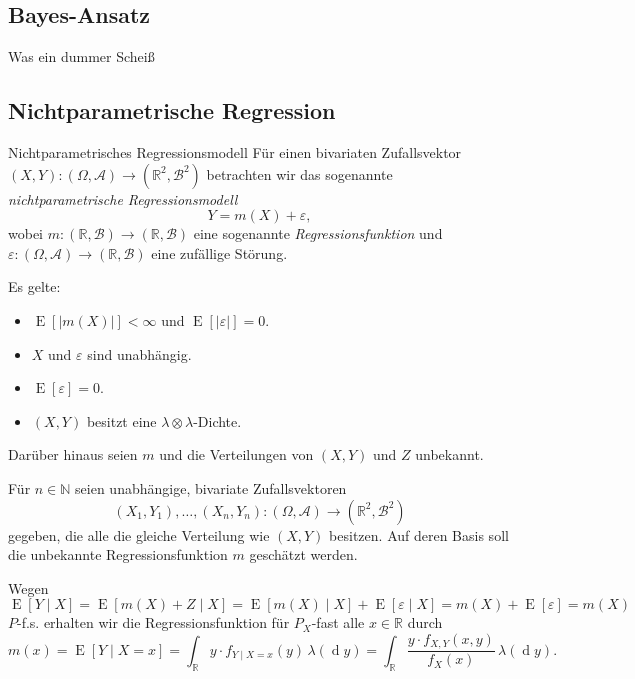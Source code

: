 \subsection{Bayes-Ansatz}

Was ein dummer Scheiß

\subsection{Nichtparametrische Regression}

\begin{defi}{Nichtparametrisches Regressionsmodell}
    Für einen bivariaten Zufallsvektor $(X, Y) : (\Omega, \mathcal{A}) \to (\mathbb{R}^2, \mathcal{B}^2)$ betrachten wir das sogenannte \emph{nichtparametrische Regressionsmodell}
    \[
        Y = m(X) + \varepsilon,
    \]
    wobei $m : (\mathbb{R}, \mathcal{B}) \to (\mathbb{R}, \mathcal{B})$ eine sogenannte \emph{Regressionsfunktion} und $\varepsilon: (\Omega, \mathcal{A}) \to (\mathbb{R}, \mathcal{B})$ eine zufällige Störung.

    Es gelte:
    \begin{itemize}
        \item $\operatorname{E}[|m(X)|] < \infty$ und $\operatorname{E}[|\varepsilon|] = 0$.
        \item $X$ und $\varepsilon$ sind unabhängig.
        \item $\operatorname{E}[\varepsilon] = 0$.
        \item $(X, Y)$ besitzt eine $\lambda \otimes \lambda$-Dichte.
    \end{itemize}

    Darüber hinaus seien $m$ und die Verteilungen von $(X, Y)$ und $Z$ unbekannt.

    Für $n \in \mathbb{N}$ seien unabhängige, bivariate Zufallsvektoren
    \[
        (X_1, Y_1), \ldots, (X_n, Y_n) : (\Omega, \mathcal{A}) \to (\mathbb{R}^2, \mathcal{B}^2)
    \]
    gegeben, die alle die gleiche Verteilung wie $(X, Y)$ besitzen.
    Auf deren Basis soll die unbekannte Regressionsfunktion $m$ geschätzt werden.

    Wegen
    \[
        \operatorname{E}[Y \mid X] = \operatorname{E}[m(X) + Z \mid X] = \operatorname{E}[m(X) \mid X] + \operatorname{E}[\varepsilon \mid X] = m(X) + \operatorname{E}[\varepsilon] = m(X)
    \]
    $P$-f.s. erhalten wir die Regressionsfunktion für $P_X$-fast alle $x \in \mathbb{R}$ durch
    \[
        m(x) = \operatorname{E}[Y \mid X = x] = \int_\mathbb{R} y \cdot f_{Y \mid X = x}(y) \, \lambda(\operatorname{d}y) = \int_\mathbb{R} \frac{y \cdot f_{X, Y}(x, y)}{f_X(x)} \, \lambda(\operatorname{d}y).
    \]
\end{defi}

